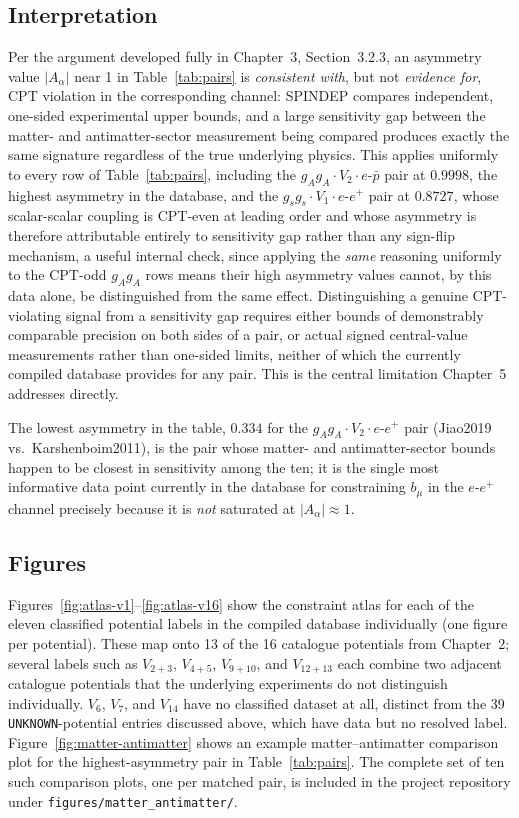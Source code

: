 \documentclass[main]{subfiles}
\begin{document}
\subsection{Interpretation}

Per the argument developed fully in Chapter~3, Section~3.2.3, an
asymmetry value $|A_\alpha|$ near 1 in Table~\ref{tab:pairs} is
\emph{consistent with}, but not \emph{evidence for}, CPT violation in the
corresponding channel: SPINDEP compares independent, one-sided experimental
upper bounds, and a large sensitivity gap between the matter- and
antimatter-sector measurement being compared produces exactly the same
signature regardless of the true underlying physics. This applies uniformly
to every row of Table~\ref{tab:pairs}, including the $g_Ag_A\cdot V_2\cdot e$-$\bar p$
pair at $0.9998$, the highest asymmetry in the database, and the
$g_sg_s\cdot V_1\cdot e$-$e^+$ pair at $0.8727$, whose scalar-scalar
coupling is CPT-even at leading order and whose asymmetry is therefore
attributable entirely to sensitivity gap rather than any sign-flip
mechanism, a useful internal check, since applying the \emph{same}
reasoning uniformly to the CPT-odd $g_Ag_A$ rows means their high asymmetry
values cannot, by this data alone, be distinguished from the same
effect. Distinguishing a genuine CPT-violating signal from a sensitivity
gap requires either bounds of demonstrably comparable precision on both
sides of a pair, or actual signed central-value measurements rather than
one-sided limits, neither of which the currently compiled database
provides for any pair. This is the central limitation Chapter~5 addresses
directly.

The lowest asymmetry in the table, $0.334$ for the $g_Ag_A\cdot V_2\cdot e$-$e^+$
pair (Jiao2019 vs.\ Karshenboim2011), is the pair whose matter- and
antimatter-sector bounds happen to be closest in sensitivity among the ten;
it is the single most informative data point currently in the database for
constraining $b_\mu$ in the $e$-$e^+$ channel precisely because it is
\emph{not} saturated at $|A_\alpha|\approx1$.

\subsection{Figures}

Figures~\ref{fig:atlas-v1}--\ref{fig:atlas-v16} show the constraint atlas
for each of the eleven classified potential labels in the compiled
database individually (one figure per potential). These map onto 13 of the 16 catalogue potentials
from Chapter~2; several labels such as $V_{2+3}$, $V_{4+5}$, $V_{9+10}$,
and $V_{12+13}$ each combine two adjacent catalogue potentials that the
underlying experiments do not distinguish individually. $V_6$, $V_7$, and
$V_{14}$ have no classified dataset at all, distinct from the 39
\texttt{UNKNOWN}-potential entries discussed above, which have data but no
resolved label. Figure~\ref{fig:matter-antimatter} shows an example
matter--antimatter comparison plot for the highest-asymmetry pair in
Table~\ref{tab:pairs}. The complete set of ten such comparison plots, one
per matched pair, is included in the project repository under
\texttt{figures/matter\_antimatter/}.
\end{document}

